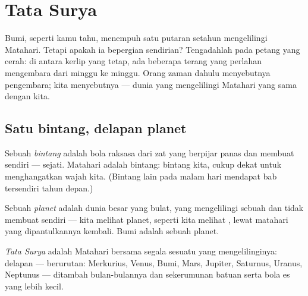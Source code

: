 \chapter{Tata Surya}\label{ch:g4:solar-system}

Bumi, seperti kamu tahu, menempuh satu putaran setahun mengelilingi
Matahari. Tetapi apakah ia bepergian sendirian? Tengadahlah pada
petang yang cerah: di antara kerlip yang tetap, ada beberapa 
terang yang perlahan mengembara dari minggu ke minggu. Orang zaman
dahulu menyebutnya pengembara; kita menyebutnya  --- dunia yang
mengelilingi Matahari yang sama dengan kita.

\section{Satu bintang, delapan planet}

\begin{definition}[Bintang]\label{def:g4:solar-system:star}
Sebuah \emph{bintang} adalah bola raksasa dari zat yang
berpijar panas dan membuat  sendiri ---  sejati.
Matahari adalah bintang: bintang kita, cukup dekat untuk menghangatkan
wajah kita. (Bintang lain pada malam hari mendapat bab tersendiri
tahun depan.)
\end{definition}

\begin{definition}[Planet]\label{def:g4:solar-system:planet}
Sebuah \emph{planet} adalah dunia besar yang bulat, yang
mengelilingi sebuah  dan tidak membuat  sendiri --- kita
melihat planet, seperti kita melihat , lewat  matahari yang
dipantulkannya kembali. Bumi adalah sebuah planet.
\end{definition}

\begin{definition}\label{def:g4:solar-system:family}
\emph{Tata Surya} adalah Matahari bersama segala
sesuatu yang mengelilinginya: delapan  --- berurutan: Merkurius, Venus, Bumi, Mars, Jupiter, Saturnus,
Uranus, Neptunus --- ditambah bulan-bulannya dan sekerumunan batuan
serta bola es yang lebih kecil.
\end{definition}

